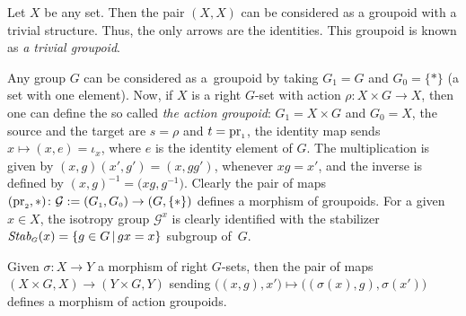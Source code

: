 \documentclass[10pt,a4paper]{amsart}
\numberwithin{equation}{section}
\newcommand{\cG}{{\mathcal G}}
\newcommand{\Sscript}[1]{\scriptscriptstyle{#1}}
\begin{document}
\begin{Example}\label{exam:trivial}Let $X$ be any set. Then the pair $(X, X)$ can be considered as a groupoid with a trivial structure. Thus, the only arrows are the identities. This groupoid is known as \emph{a trivial groupoid}.
\end{Example}

\begin{Example}\label{exam:action}  Any group $G$ can be considered as a~groupoid by taking $G_{\Sscript{1}}=G$ and $G_{\Sscript{0}}=\{*\}$ (a set with one element). Now, if $X$ is a right $G$-set with action $\rho\colon X\times G \to X$, then one can define the so called \emph{the action groupoid}: $G_{\Sscript{1}}=X \times G$ and $G_{\Sscript{0}}=X$, the source and the target are $s=\rho$ and $t={\rm pr}_{\Sscript{1}}$, the identity map sends $x \mapsto (x, e)=\iota_{\Sscript{x}}$, where $e$ is the identity element of $G$. The multiplication is given by $(x,g) (x',g')=(x,gg')$, whenever $xg=x'$, and the inverse is defined by $(x,g)^{-1}=\big(xg,g^{-1}\big)$. Clearly the pair of maps $({\rm pr}_{\Sscript{2}}, *)\colon \cG:= (G_{\Sscript{1}}, G_{\Sscript{0}}) \to (G,\{*\})$ defines a morphism of groupoids. For a given $ x \in X$, the isotropy group $\cG^{\Sscript{x}}$ is clearly identified with the stabilizer $\emph{Stab}_{\Sscript{G}}(x)=\{g \in G \,|\, gx=x\}$ subgroup of~$G$.

Given $\sigma\colon X \to Y$ a morphism of right $G$-sets, then the pair of maps $(X\times G, X) \to (Y\times G, Y)$ sending $\big( (x,g), x' \big) \mapsto \big( (\sigma(x), g),\sigma(x') \big)$ defines a morphism of action groupoids.
\end{Example}
\end{document}
